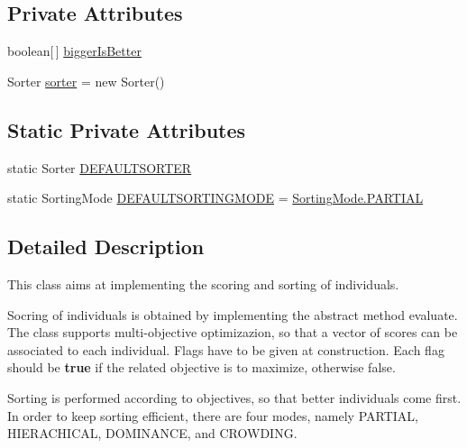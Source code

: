 \subsection*{Private Attributes}
\begin{DoxyCompactItemize}
\item 
boolean\mbox{[}$\,$\mbox{]} \hyperlink{classjenes_1_1population_1_1_fitness_3_01_c_01extends_01_chromosome_01_4_a74cc583a8dad5cf23cfd6f1f425e7158}{bigger\-Is\-Better}
\item 
Sorter \hyperlink{classjenes_1_1population_1_1_fitness_3_01_c_01extends_01_chromosome_01_4_abdfac597ad9740bcbbf1ec05ea42c246}{sorter} = new Sorter()
\end{DoxyCompactItemize}
\subsection*{Static Private Attributes}
\begin{DoxyCompactItemize}
\item 
static Sorter \hyperlink{classjenes_1_1population_1_1_fitness_3_01_c_01extends_01_chromosome_01_4_a074873b9c68c7bb0c860e17dd9d76441}{D\-E\-F\-A\-U\-L\-T\-S\-O\-R\-T\-E\-R}
\item 
static Sorting\-Mode \hyperlink{classjenes_1_1population_1_1_fitness_3_01_c_01extends_01_chromosome_01_4_a314a7dbf1f6c36bc914845a20c370f82}{D\-E\-F\-A\-U\-L\-T\-S\-O\-R\-T\-I\-N\-G\-M\-O\-D\-E} = \hyperlink{enumjenes_1_1population_1_1_fitness_3_01_c_01extends_01_chromosome_01_4_1_1_sorting_mode_a2cb76e719083d62c0a13a3bcb947aa72}{Sorting\-Mode.\-P\-A\-R\-T\-I\-A\-L}
\end{DoxyCompactItemize}


\subsection{Detailed Description}
This class aims at implementing the scoring and sorting of individuals. 

Socring of individuals is obtained by implementing the abstract method {\ttfamily evaluate}. The class supports multi-\/objective optimizazion, so that a vector of scores can be associated to each individual. Flags have to be given at construction. Each flag should be {\bfseries true} if the related objective is to maximize, otherwise false. 

Sorting is performed according to objectives, so that better individuals come first. In order to keep sorting efficient, there are four modes, namely {\ttfamily P\-A\-R\-T\-I\-A\-L}, {\ttfamily H\-I\-E\-R\-A\-C\-H\-I\-C\-A\-L}, {\ttfamily D\-O\-M\-I\-N\-A\-N\-C\-E}, and {\ttfamily C\-R\-O\-W\-D\-I\-N\-G}. 

